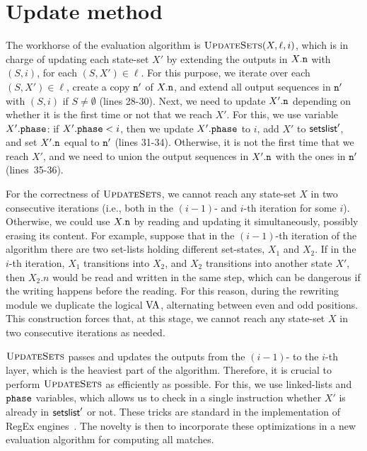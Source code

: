 \section{Update method}
The workhorse of the evaluation algorithm is $\textproc{UpdateSets}(X, \ell,i)$,
which is in charge of updating each state-set $X'$ by extending the outputs in
$X.\mathtt{n}$ with $(S,i)$, for each $(S, X') \in \!\ell$. For this purpose, we
iterate over each $(S, X') \in \ell$, create a copy $\mathtt{n}'$ of $X.\mathtt{n}$, and
extend all output sequences in $\mathtt{n}'$ with $(S,i)$ if $S\neq \emptyset$ (lines
28-30). Next, we need to update $X'.\mathtt{n}$ depending on whether it is the first
time or not that we reach $X'$. For this, we use variable $X'.\texttt{phase}$: if
$X'.\texttt{phase} < i$, then we update $X'.\texttt{phase}$ to $i$, add $X'$ to
$\textsf{setslist}'$, and set $X'.\mathtt{n}$ equal to $\mathtt{n}'$ (lines 31-34). Otherwise,
it is not the first time that we reach $X'$, and we need to union the output
sequences in $X'.\mathtt{n}$ with the ones in $\mathtt{n}'$ (lines~35-36).

For the correctness of $\textproc{UpdateSets}$, we cannot reach any state-set
$X$ in two consecutive iterations (i.e., both in the $(i-1)$- and $i$-th
iteration for some $i$). Otherwise, we could use $X.\mathtt{n}$ by reading and
updating it simultaneously, possibly erasing its content. For example, suppose
that in the $(i-1)$-th iteration of the algorithm there are two set-lists
holding different set-states, $X_1$ and $X_2$. If in the $i$-th iteration, $X_1$
transitions into $X_2$, and $X_2$ transitions into another state $X'$, then
$X_2.n$ would be read and written in the same step, which can be dangerous if
the writing happens before the reading.   For this reason, during the rewriting
module we duplicate the logical $\mathrm{VA}$, alternating between even and odd
positions. This construction forces that, at this stage, we cannot reach any
state-set $X$ in two consecutive iterations as needed.


$\textproc{UpdateSets}$ passes and updates the outputs from the $(i-1)$- to the
$i$-th layer, which is the heaviest part of the algorithm. Therefore, it is
crucial to perform $\textproc{UpdateSets}$ as efficiently as possible. For this,
we use linked-lists and $\texttt{phase}$ variables, which allows us to check in a single
instruction whether $X'$ is already in $\textsf{setslist}'$ or not. These tricks are
standard in the implementation of RegEx engines~\citep{cox2007regular}. The
novelty is then to incorporate these optimizations in a new evaluation algorithm
for computing all matches.

